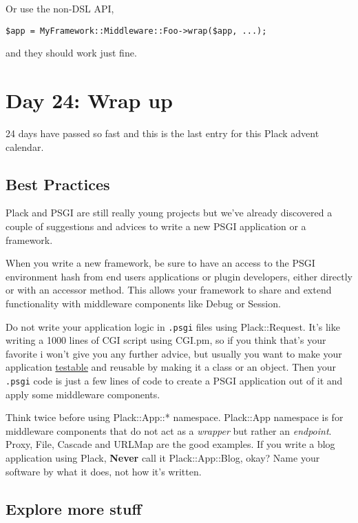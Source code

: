 Or use the non-DSL API,

\begin{lstlisting}
$app = MyFramework::Middleware::Foo->wrap($app, ...);
\end{lstlisting}

and they should work just fine.

\chapter{Day 24: Wrap up}\label{day-24-wrap-up}

24 days have passed so fast and this is the last entry for this Plack
advent calendar.

\section{Best Practices}\label{best-practices}

Plack and PSGI are still really young projects but we've already
discovered a couple of suggestions and advices to write a new PSGI
application or a framework.

When you write a new framework, be sure to have an access to the PSGI
environment hash from end users applications or plugin developers,
either directly or with an accessor method. This allows your framework
to share and extend functionality with middleware components like Debug
or Session.

Do not write your application logic in \lstinline!.psgi! files using
Plack::Request. It's like writing a 1000 lines of CGI script using
CGI.pm, so if you think that's your favorite i won't give you any
further advice, but usually you want to make your application
\href{http://advent.plackperl.org/2009/12/day-13-use-placktest-to-test-your-application.html}{testable}
and reusable by making it a class or an object. Then your
\lstinline!.psgi! code is just a few lines of code to create a PSGI
application out of it and apply some middleware components.

Think twice before using Plack::App::* namespace. Plack::App namespace
is for middleware components that do not act as a \emph{wrapper} but
rather an \emph{endpoint}. Proxy, File, Cascade and URLMap are the good
examples. If you write a blog application using Plack, \textbf{Never}
call it Plack::App::Blog, okay? Name your software by what it does, not
how it's written.

\section{Explore more stuff}\label{explore-more-stuff}

